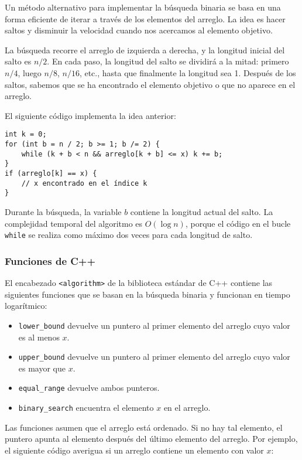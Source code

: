 Un método alternativo para implementar la búsqueda binaria
se basa en una forma eficiente de iterar a través de
los elementos del arreglo.
La idea es hacer saltos y disminuir la velocidad
cuando nos acercamos al elemento objetivo.

La búsqueda recorre el arreglo de izquierda a
derecha, y la longitud inicial del salto es $n/2$.
En cada paso, la longitud del salto se dividirá a la mitad:
primero $n/4$, luego $n/8$, $n/16$, etc., hasta
que finalmente la longitud sea 1.
Después de los saltos, sabemos que se ha encontrado el elemento
objetivo o que no aparece en el arreglo.

\newpage
El siguiente código implementa la idea anterior:
\begin{lstlisting}
int k = 0;
for (int b = n / 2; b >= 1; b /= 2) {
    while (k + b < n && arreglo[k + b] <= x) k += b;
}
if (arreglo[k] == x) {
    // x encontrado en el índice k
}
\end{lstlisting}

Durante la búsqueda, la variable $b$
contiene la longitud actual del salto.
La complejidad temporal del algoritmo es $O(\log n)$,
porque el código en el bucle \texttt{while}
se realiza como máximo dos veces para cada longitud de salto.

\subsubsection{Funciones de C++}

El encabezado \texttt{<algorithm>} de la biblioteca estándar
de C++ contiene las siguientes funciones
que se basan en la búsqueda binaria y funcionan en tiempo logarítmico:

\begin{itemize}
    \item \texttt{lower\_bound} devuelve un puntero al
          primer elemento del arreglo cuyo valor es al menos $x$.
    \item \texttt{upper\_bound} devuelve un puntero al
          primer elemento del arreglo cuyo valor es mayor que $x$.
    \item \texttt{equal\_range} devuelve ambos punteros.
    \item \texttt{binary\_search} encuentra el elemento $x$
          en el arreglo.
\end{itemize}

Las funciones asumen que el arreglo está ordenado.
Si no hay tal elemento, el puntero apunta al
elemento después del último elemento del arreglo.
Por ejemplo, el siguiente código averigua si
un arreglo contiene un elemento con valor $x$:

